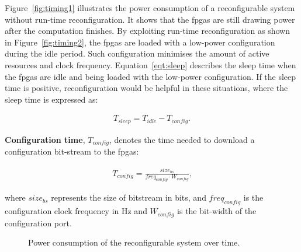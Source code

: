 Figure~\ref{fig:timing1} illustrates the power consumption of a reconfigurable system without run-time reconfiguration.
It shows that the \glspl{fpga} are still drawing power after the computation finishes.
By exploiting run-time reconfiguration as shown in Figure~\ref{fig:timing2}, the \glspl{fpga} are loaded with a low-power configuration during the idle period.
Such configuration minimises the amount of active resources and clock frequency.
Equation~\ref{eqt:sleep} describes the sleep time when the \glspl{fpga} are idle and being loaded with the low-power configuration.
If the sleep time is positive, reconfiguration would be helpful in these situations, where the sleep time is expressed as:

\begin{equation}
\begin{aligned}
T_{sleep} = T_{idle} - T_{config} \mbox{.}
\end{aligned}
\label{eqt:sleep}
\end{equation}

\textbf{Configuration time}, $T_{config}$, denotes the time needed to download a configuration bit-stream to the \glspl{fpga}:

\begin{equation}
\begin{aligned}
T_{config} = \frac{size_{bs}}{freq_{config} \cdot W_{config}} \mbox{,}
\end{aligned}
\label{eqt:cf}
\end{equation}

where $size_{bs}$ represents the size of bitstream in bits, and $freq_{config}$ is the configuration clock frequency in Hz and $W_{config}$ is the bit-width of the configuration port.

\setcounter{subfigure}{0}
\begin{figure}[t!]
\centering
{}
\caption{Power consumption of the reconfigurable system over time.}
\label{fig:timing}
\end{figure}

